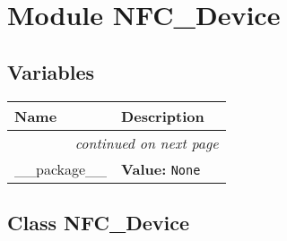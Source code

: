 %
%
%


\section{Module NFC\_Device}

    \label{NFC_Device}


  \subsection{Variables}

    \vspace{-1cm}
\hspace{\varindent}\begin{longtable}{|p{\varnamewidth}|p{\vardescrwidth}|l}
\cline{1-2}
\cline{1-2} \centering \textbf{Name} & \centering \textbf{Description}& \\
\cline{1-2}
\endhead\cline{1-2}\multicolumn{3}{r}{\small\textit{continued on next page}}\\\endfoot\cline{1-2}
\endlastfoot\raggedright \_\-\_\-p\-a\-c\-k\-a\-g\-e\-\_\-\_\- & \raggedright \textbf{Value:} 
{\tt None}&\\
\cline{1-2}
\end{longtable}



\subsection{Class NFC\_Device}

